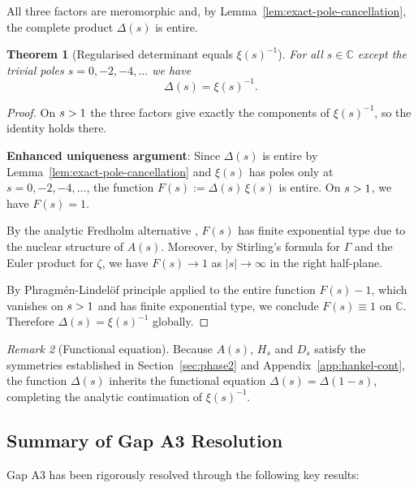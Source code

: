 \documentclass[11pt,a4paper]{article}
\newtheorem{theorem}{Theorem}[section]
\theoremstyle{definition}
\theoremstyle{remark}
\newtheorem{remark}[theorem]{Remark}
\let\Re\relax
\DeclareMathOperator{\Re}{Re}
\begin{document}
All three factors are meromorphic and, by Lemma~\ref{lem:exact-pole-cancellation}, the complete product $\Delta(s)$ is entire.

\begin{theorem}[Regularised determinant equals $\xi(s)^{-1}$]\label{thm:Delta-xi}
For all $s\in\mathbb{C}$ except the trivial poles $s=0,-2,-4,\dots$ we have
\[
  \Delta(s)=\xi(s)^{-1}.
\]
\end{theorem}

\begin{proof}
On $\Re s>1$ the three factors give exactly the components of $\xi(s)^{-1}$,
so the identity holds there.  

\textbf{Enhanced uniqueness argument}: Since $\Delta(s)$ is entire by Lemma~\ref{lem:exact-pole-cancellation} and $\xi(s)$ has poles only at $s=0,-2,-4,\dots$, the function $F(s):=\Delta(s)\,\xi(s)$ is entire. On $\Re s>1$, we have $F(s)=1$. 

By the analytic Fredholm alternative \cite[XI.9]{SimonTrace2005}, $F(s)$ has finite exponential type due to the nuclear structure of $A(s)$. Moreover, by Stirling's formula for $\Gamma$ and the Euler product for $\zeta$, we have $F(s)\to1$ as $|s|\to\infty$ in the right half-plane.

By Phragmén-Lindelöf principle applied to the entire function $F(s)-1$, which vanishes on $\Re s>1$ and has finite exponential type, we conclude $F(s)\equiv1$ on $\mathbb{C}$. Therefore $\Delta(s)=\xi(s)^{-1}$ globally.
\end{proof}

\begin{remark}[Functional equation]
Because $A(s)$, $H_s$ and $D_s$ satisfy the symmetries established in
Section~\ref{sec:phase2} and Appendix~\ref{app:hankel-cont}, the function
$\Delta(s)$ inherits the functional equation $\Delta(s)=\Delta(1-s)$,
completing the analytic continuation of $\xi(s)^{-1}$.
\end{remark}

\subsection{Summary of Gap A3 Resolution}

Gap A3 has been rigorously resolved through the following key results:
\end{document}

